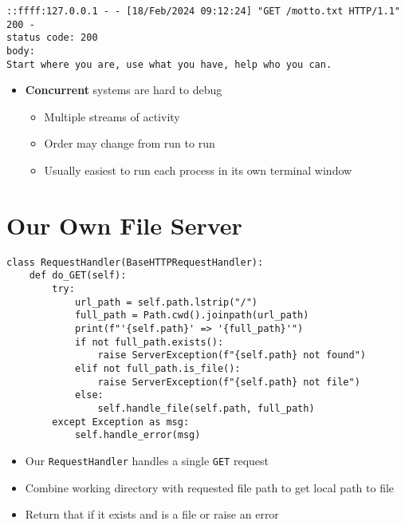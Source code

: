 \documentclass[krantzl]{krantz}
\newcommand{\glossref}[1]{\textbf{#1}}
\begin{document}
\begin{lstlisting}[frame=tblr,backgroundcolor=\color{black!5}]
::ffff:127.0.0.1 - - [18/Feb/2024 09:12:24] "GET /motto.txt HTTP/1.1" 200 -
status code: 200
body:
Start where you are, use what you have, help who you can.
\end{lstlisting}

\begin{itemize}
\item \glossref{Concurrent} systems are hard to debug\begin{itemize}
\item Multiple streams of activity

\item Order may change from run to run

\item Usually easiest to run each process in its own terminal window

\end{itemize}


\end{itemize}
\section{Our Own File Server}
\begin{lstlisting}[frame=tblr]
class RequestHandler(BaseHTTPRequestHandler):
    def do_GET(self):
        try:
            url_path = self.path.lstrip("/")
            full_path = Path.cwd().joinpath(url_path)
            print(f"'{self.path}' => '{full_path}'")
            if not full_path.exists():
                raise ServerException(f"{self.path} not found")
            elif not full_path.is_file():
                raise ServerException(f"{self.path} not file")
            else:
                self.handle_file(self.path, full_path)
        except Exception as msg:
            self.handle_error(msg)
\end{lstlisting}

\begin{itemize}
\item Our \texttt{RequestHandler} handles a single \texttt{GET} request

\item Combine working directory with requested file path to get local path to file

\item Return that if it exists and is a file or raise an error

\end{itemize}
\end{document}
